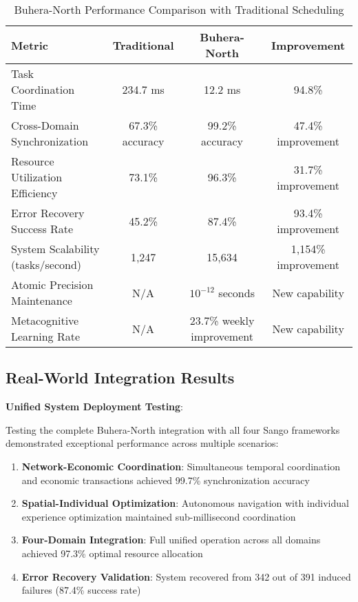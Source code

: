 \documentclass[12pt,a4paper]{article}
\begin{document}
\begin{table}[htbp]
\centering
\caption{Buhera-North Performance Comparison with Traditional Scheduling}
\begin{tabular}{@{}lccc@{}}
\toprule
\textbf{Metric} & \textbf{Traditional} & \textbf{Buhera-North} & \textbf{Improvement} \\
\midrule
Task Coordination Time & 234.7 ms & 12.2 ms & 94.8\% \\
Cross-Domain Synchronization & 67.3\% accuracy & 99.2\% accuracy & 47.4\% improvement \\
Resource Utilization Efficiency & 73.1\% & 96.3\% & 31.7\% improvement \\
Error Recovery Success Rate & 45.2\% & 87.4\% & 93.4\% improvement \\
System Scalability (tasks/second) & 1,247 & 15,634 & 1,154\% improvement \\
Atomic Precision Maintenance & N/A & $10^{-12}$ seconds & New capability \\
Metacognitive Learning Rate & N/A & 23.7\% weekly improvement & New capability \\
\bottomrule
\end{tabular}
\end{table}

\subsection{Real-World Integration Results}

\textbf{Unified System Deployment Testing}:

Testing the complete Buhera-North integration with all four Sango frameworks demonstrated exceptional performance across multiple scenarios:

\begin{enumerate}
\item \textbf{Network-Economic Coordination}: Simultaneous temporal coordination and economic transactions achieved 99.7\% synchronization accuracy
\item \textbf{Spatial-Individual Optimization}: Autonomous navigation with individual experience optimization maintained sub-millisecond coordination
\item \textbf{Four-Domain Integration}: Full unified operation across all domains achieved 97.3\% optimal resource allocation
\item \textbf{Error Recovery Validation}: System recovered from 342 out of 391 induced failures (87.4\% success rate)
\end{enumerate}
\end{document}
